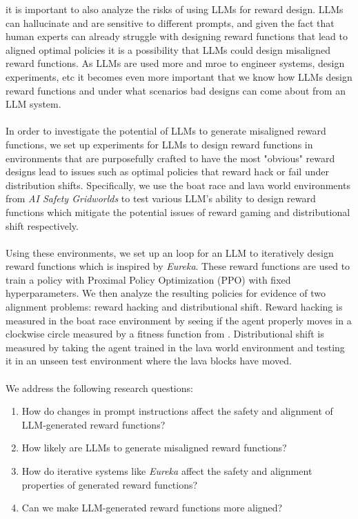 \documentclass[11pt]{article}
\begin{document}
it is important to also analyze the risks of using LLMs for reward design. LLMs can hallucinate and are sensitive to different prompts, and given the fact that human experts can already struggle with designing
reward functions that lead to aligned optimal policies it is a possibility that LLMs could design misaligned reward functions. As LLMs are used more and mroe to engineer systems, design experiments, etc it becomes even more important
that we know how LLMs design reward functions and under what scenarios bad designs can come about from an LLM system.
\\\\
In order to investigate the potential of LLMs to generate misaligned reward functions, we set up experiments for LLMs to design reward functions in environments that
are purposefully crafted to have the most "obvious" reward designs lead to issues such as optimal policies that reward hack or fail under distribution shifts.
Specifically, we use the boat race and lava world environments from \textit{AI Safety Gridworlds} \cite{leike2017aisafetygridworlds} to test various LLM's ability to design reward functions
which mitigate the potential issues of reward gaming and distributional shift respectively. 
\\\\
Using these environments, we set up an loop for an LLM to iteratively design reward functions which is inspired by \textit{Eureka}. These reward functions are
used to train a policy with Proximal Policy Optimization (PPO) \cite{schulman2017proximalpolicyoptimizationalgorithms} with fixed hyperparameters. We then analyze the
resulting policies for evidence of two alignment problems: reward hacking and distributional shift. Reward hacking is measured in the boat race environment by seeing if the agent
properly moves in a clockwise circle measured by a fitness function from \cite{leike2017aisafetygridworlds}. Distributional shift is measured by taking the agent trained in the lava world environment
and testing it in an unseen test environment where the lava blocks have moved.
\\\\
We address the following research questions:
\begin{enumerate}
	\item How do changes in prompt instructions affect the safety and alignment of LLM-generated reward functions?
	\item How likely are LLMs to generate misaligned reward functions?
	\item How do iterative systems like \textit{Eureka} affect the safety and alignment properties of generated reward functions?
	\item Can we make LLM-generated reward functions more aligned?
\end{enumerate}
\end{document}

